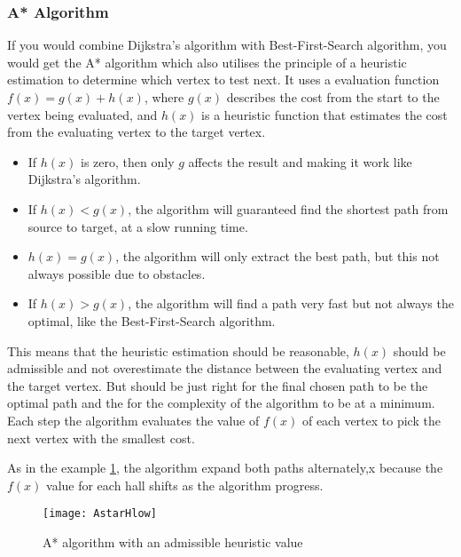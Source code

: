   \subsubsection{A* Algorithm}

  If you would combine Dijkstra's algorithm with Best-First-Search algorithm, you would get the A* algorithm which also utilises the principle of a heuristic estimation to determine which vertex to test next. It uses a evaluation function $f(x) = g(x) + h(x)$, where $g(x)$ describes the cost from the start to the vertex being evaluated, and $h(x)$ is a heuristic function that estimates the cost from the evaluating vertex to the target vertex. \cite{Patel2013}

  \begin{itemize}
    \item If $h(x)$ is zero, then only $g$ affects the result and making it work like Dijkstra's algorithm.

    \item If $h(x) < g(x)$, the algorithm will guaranteed find the shortest path from source to target, at a slow running time.

    \item $h(x) = g(x)$, the algorithm will only extract the best path, but this not always possible due to obstacles.

    \item If $h(x) > g(x)$, the algorithm will find a path very fast but not always the optimal, like the Best-First-Search algorithm.
  \end{itemize}

  This means that the heuristic estimation should be reasonable, $h(x)$ should be admissible and not overestimate the distance between the evaluating vertex and the target vertex. But should be just right for the final chosen path to be the optimal path and the for the complexity of the algorithm to be at a minimum. Each step the algorithm evaluates the value of $f(x)$ of each vertex to pick the next vertex with the smallest cost.

  As in the example \cref{astar}, the algorithm expand both paths alternately,x because the $f(x)$ value for each hall shifts as the algorithm progress. 

  \begin{figure}[ht!]
    \centering
    \texttt{[image: AstarHlow]}
    \caption{A* algorithm with an admissible heuristic value}
    \label{astar}
  \end{figure}

